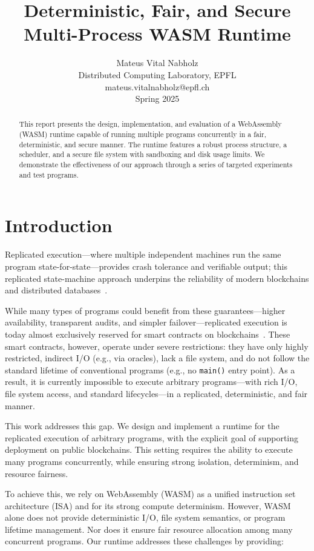 \documentclass[10pt,a4paper,twocolumn]{IEEEtran}
\title{Deterministic, Fair, and Secure Multi-Process WASM Runtime}
\author{Mateus Vital Nabholz \\ Distributed Computing Laboratory, EPFL \\ mateus.vitalnabholz@epfl.ch \\ Spring 2025}
\date{}
\begin{document}
\maketitle

\begin{abstract}
This report presents the design, implementation, and evaluation of a WebAssembly (WASM) runtime capable of running multiple programs concurrently in a fair, deterministic, and secure manner. The runtime features a robust process structure, a scheduler, and a secure file system with sandboxing and disk usage limits. We demonstrate the effectiveness of our approach through a series of targeted experiments and test programs.
\end{abstract}

\section{Introduction}\label{sec:intro}

Replicated execution—where multiple independent machines run the same program state-for-state—provides crash tolerance and verifiable output; this replicated state-machine approach underpins the reliability of modern blockchains and distributed databases~\cite{schneider_smr}.

While many types of programs could benefit from these guarantees—higher availability, transparent audits, and simpler failover—replicated execution is today almost exclusively reserved for smart contracts on blockchains~\cite{ethereum}. These smart contracts, however, operate under severe restrictions: they have only highly restricted, indirect I/O (e.g., via oracles), lack a file system, and do not follow the standard lifetime of conventional programs (e.g., no \texttt{main()} entry point). As a result, it is currently impossible to execute arbitrary programs—with rich I/O, file system access, and standard lifecycles—in a replicated, deterministic, and fair manner.

This work addresses this gap. We design and implement a runtime for the replicated execution of arbitrary programs, with the explicit goal of supporting deployment on public blockchains. This setting requires the ability to execute many programs concurrently, while ensuring strong isolation, determinism, and resource fairness.

To achieve this, we rely on WebAssembly (WASM) as a unified instruction set architecture (ISA) and for its strong compute determinism. However, WASM alone does not provide deterministic I/O, file system semantics, or program lifetime management. Nor does it ensure fair resource allocation among many concurrent programs. Our runtime addresses these challenges by providing:
\end{document}
